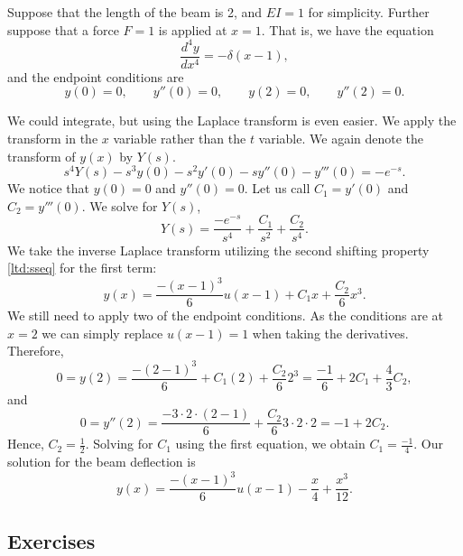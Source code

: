 \begin{example} \label{lt:examplebeam}
Suppose that the length of the beam is 2, and $EI=1$ for
simplicity.  Further suppose that a force $F=1$ is applied at $x=1$.
That is, we have the equation
\begin{equation*}
\frac{d^4 y}{dx^4} = -\delta(x-1) ,
\end{equation*}
and the endpoint conditions are
\begin{equation*}
y(0) = 0, \qquad y''(0) = 0, \qquad
y(2) = 0, \qquad y''(2) = 0.
\end{equation*}

We could integrate, but using the Laplace transform
is even easier.
We apply the transform
in the $x$ variable rather than the $t$ variable.  We again denote the
transform of $y(x)$ by $Y(s)$.
\begin{equation*}
s^4Y(s)-s^3y(0)-s^2y'(0)-sy''(0)-y'''(0)
= -e^{-s}.
\end{equation*}
We notice that $y(0) = 0$ and $y''(0) = 0$.  Let us
call $C_1 = y'(0)$ and $C_2=y'''(0)$.
We solve for $Y(s)$,
\begin{equation*}
Y(s) = \frac{-e^{-s}}{s^4} + \frac{C_1}{s^2}+ \frac{C_2}{s^4} .
\end{equation*}
We take the inverse Laplace transform utilizing the 
second shifting property \eqref{ltd:sseq} for the first
term:
\begin{equation*}
y(x) = \frac{-{(x-1)}^3}{6} u(x-1) + C_1 x + \frac{C_2}{6} x^3 .
\end{equation*}
We still need to apply two of the endpoint conditions.  As the conditions
are at $x=2$ we can simply replace $u(x-1) = 1$ when taking
the derivatives.  Therefore,
\begin{equation*}
0 = y(2) = \frac{-{(2-1)}^3}{6} + C_1 (2) + \frac{C_2}{6} 2^3 =
\frac{-1}{6} + 2 C_1 + \frac{4}{3} C_2 ,
\end{equation*}
and
\begin{equation*}
0 = y''(2) = \frac{-3\cdot 2 \cdot (2-1)}{6} + \frac{C_2}{6} 3\cdot 2 \cdot 2
 = -1 + 2 C_2 .
\end{equation*}
Hence, $C_2 = \frac{1}{2}$.
Solving for $C_1$ using the first equation, we obtain
$C_1 = \frac{-1}{4}$.  Our solution for the beam deflection is
\begin{equation*}
y(x) = \frac{-{(x-1)}^3}{6} u(x-1) - \frac{x}{4} + \frac{x^3}{12} .
\end{equation*}
\end{example}

\subsection{Exercises}


